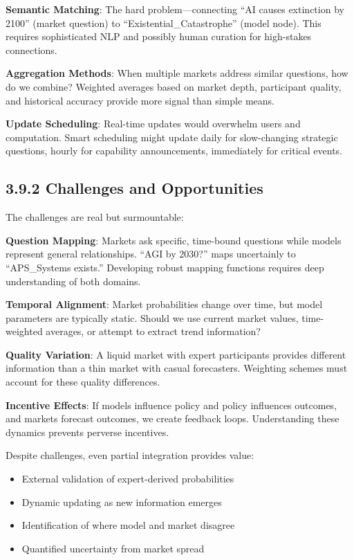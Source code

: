 \documentclass[
  11pt,
  letterpaper,
]{book}
\providecommand{\tightlist}{%
  \setlength{\itemsep}{0pt}\setlength{\parskip}{0pt}}
\begin{document}
\textbf{Semantic Matching}: The hard problem---connecting ``AI causes
extinction by 2100'' (market question) to ``Existential\_Catastrophe''
(model node). This requires sophisticated NLP and possibly human
curation for high-stakes connections.

\textbf{Aggregation Methods}: When multiple markets address similar
questions, how do we combine? Weighted averages based on market depth,
participant quality, and historical accuracy provide more signal than
simple means.

\textbf{Update Scheduling}: Real-time updates would overwhelm users and
computation. Smart scheduling might update daily for slow-changing
strategic questions, hourly for capability announcements, immediately
for critical events.

\subsection{3.9.2 Challenges and
Opportunities}\label{sec-market-challenges}

The challenges are real but surmountable:

\textbf{Question Mapping}: Markets ask specific, time-bound questions
while models represent general relationships. ``AGI by 2030?'' maps
uncertainly to ``APS\_Systems exists.'' Developing robust mapping
functions requires deep understanding of both domains.

\textbf{Temporal Alignment}: Market probabilities change over time, but
model parameters are typically static. Should we use current market
values, time-weighted averages, or attempt to extract trend information?

\textbf{Quality Variation}: A liquid market with expert participants
provides different information than a thin market with casual
forecasters. Weighting schemes must account for these quality
differences.

\textbf{Incentive Effects}: If models influence policy and policy
influences outcomes, and markets forecast outcomes, we create feedback
loops. Understanding these dynamics prevents perverse incentives.

Despite challenges, even partial integration provides value:

\begin{itemize}
\tightlist
\item
  External validation of expert-derived probabilities
\item
  Dynamic updating as new information emerges
\item
  Identification of where model and market disagree
\item
  Quantified uncertainty from market spread
\end{itemize}
\end{document}
